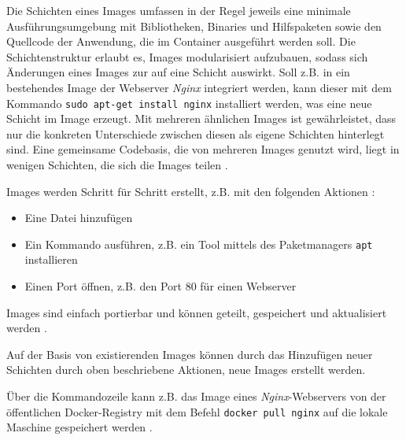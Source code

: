 \documentclass[../main.tex]{subfiles}
\begin{document}
      Die Schichten eines Images umfassen in der Regel jeweils eine minimale Ausführungsumgebung mit Bibliotheken, Binaries und Hilfspaketen sowie den Quellcode der Anwendung, die im Container ausgeführt werden soll. Die Schichtenstruktur erlaubt es, Images modularisiert aufzubauen, sodass sich Änderungen eines Images zur auf eine Schicht auswirkt. Soll z.B. in ein bestehendes Image der Webserver \emph{Nginx} integriert werden, kann dieser mit dem Kommando \texttt{sudo apt-get install nginx} installiert werden, was eine neue Schicht im Image erzeugt. Mit mehreren ähnlichen Images ist gewährleistet, dass nur die konkreten Unterschiede zwischen diesen als eigene Schichten hinterlegt sind. Eine gemeinsame Codebasis, die von mehreren Images genutzt wird, liegt in wenigen Schichten, die sich die Images teilen \cite[S.3]{dockerIntroIEEE}.







      Images werden Schritt für Schritt erstellt, z.B. mit den folgenden Aktionen \cite[S.11]{dockerBook}:

      \begin{itemize}
        \item Eine Datei hinzufügen
        \item Ein Kommando ausführen, z.B. ein Tool mittels des Paketmanagers \texttt{apt} installieren
        \item Einen Port öffnen, z.B. den Port 80 für einen Webserver
      \end{itemize}

      Images sind einfach portierbar und können geteilt, gespeichert und aktualisiert werden \cite[S.11]{dockerBook}.

      Auf der Basis von existierenden Images können durch das Hinzufügen neuer Schichten durch oben beschriebene Aktionen, neue Images erstellt werden.

      Über die Kommandozeile kann z.B. das Image eines \emph{Nginx}-Webservers von der öffentlichen Docker-Registry mit dem Befehl \texttt{docker pull nginx} auf die lokale Maschine gespeichert werden \cite{dockerHubNginx}\cite{dockerPull}.
\end{document}
